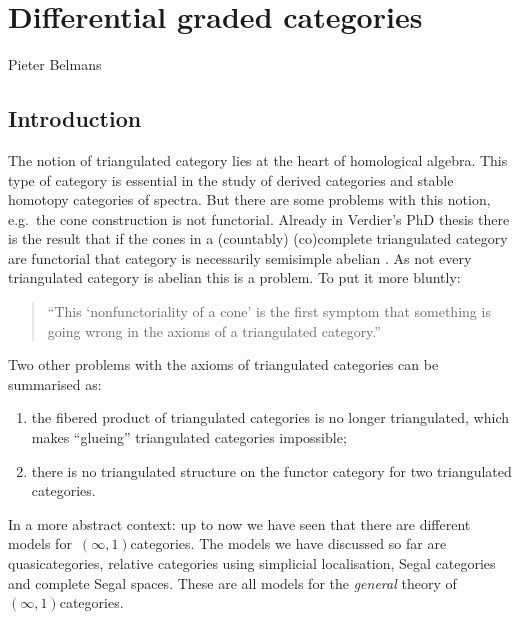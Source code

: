 \chapter{Differential graded categories}
\begin{flushright}
  Pieter Belmans
\end{flushright}

\begin{refsection}

\section{Introduction}
The notion of triangulated category lies at the heart of homological algebra. This type of category is essential in the study of derived categories and stable homotopy categories of spectra. But there are some problems with this notion, e.g.\ the cone construction is not functorial. Already in Verdier's PhD thesis there is the result that if the cones in a (countably) (co)complete triangulated category are functorial that category is necessarily semisimple abelian \cite[proposition II.1.2.13]{verdierphd}. As not every triangulated category is abelian \cite[exercise 1.4.5]{weibel} this is a problem. To put it more bluntly:
\begin{quote}
  ``This `nonfunctoriality of a cone' is the first symptom that something is going wrong in the axioms of a triangulated category.''
\end{quote}
\begin{flushright}
  \cite[section IV.7]{gelfandmanin}
\end{flushright}
Two other problems with the axioms of triangulated categories can be summarised as:
\begin{enumerate}
  \item the fibered product of triangulated categories is no longer triangulated, which makes ``glueing'' triangulated categories impossible;
  \item there is no triangulated structure on the functor category for two triangulated categories.
\end{enumerate}

In a more abstract context: up to now we have seen that there are different models for~$(\infty,1)$\dash categories. The models we have discussed so far are quasicategories, relative categories using simplicial localisation, Segal categories and complete Segal spaces. These are all models for the \emph{general} theory of~$(\infty,1)$\dash categories.


\end{refsection}
